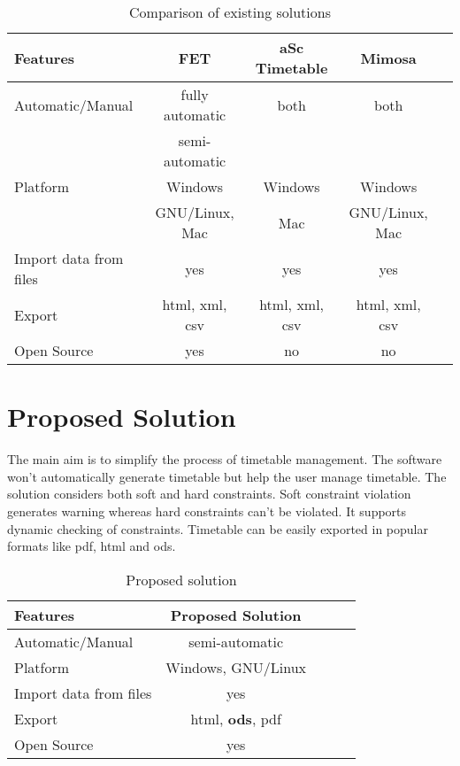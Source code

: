 \begin{table}[h!]
\centering
\begin{tabular}{|l|c|c|c|c|}
\hline
{\bfseries Features } & {\bfseries FET} & {\bfseries aSc Timetable} & {\bfseries Mimosa}  \\
\hline
Automatic/Manual & fully automatic & both & both \\
 & semi-automatic &   &   \\
 \hline
 Platform & Windows & Windows & Windows  \\
  & GNU/Linux, Mac & Mac & GNU/Linux, Mac  \\
 \hline
Import data from files & yes & yes & yes \\ 
  \hline
Export  & html, xml, csv & html, xml, csv & html, xml, csv  \\
\hline
Open Source & yes & no & no  \\
\hline
\end{tabular}
\caption{Comparison of existing solutions}
\label{tab:template}
\end{table}

\newpage
\section{Proposed Solution}
The main aim is to simplify the process of timetable management. The software won't automatically generate timetable but help the user manage timetable. The solution considers both soft and hard constraints. Soft constraint violation generates warning whereas hard constraints can't be violated. It supports dynamic checking of constraints.
Timetable can be easily exported in popular formats like pdf, html and ods. 

\begin{table}[h!]
\centering
\begin{tabular}{|l|c|c|c|c|}
\hline
 {\bfseries Features} & {\bfseries Proposed Solution} \\
\hline
Automatic/Manual & semi-automatic\\
 \hline
 Platform  & Windows, GNU/Linux\\
 \hline
Import data from files & yes\\ 
  \hline
Export  & html, {\bfseries ods}, pdf \\
\hline
Open Source & yes \\
\hline
\end{tabular}
\caption{Proposed solution}
\label{tab:template}
\end{table}

